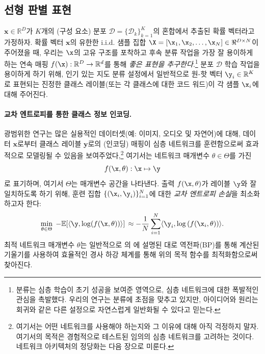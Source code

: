\documentclass[../../book-main_ko.tex]{subfiles}
\begin{document}
\subsection{선형 판별 표현}\label{subsec:LDR}

$\bm{x} \in \mathbb{R}^D$가 $K$개의 (구성 요소) 분포 $\mathcal{D} = \{\mathcal{D}_k\}_{k=1}^K$의 혼합에서 추출된 확률 벡터라고 가정하자. 확률 벡터 $\bm x$의 유한한 i.i.d. 샘플 집합 $\X = [\x_1, \x_2, \ldots, \x_N] \in \Re^{D\times N}$이 주어졌을 때, 우리는 $\x$의 고유 구조를 포착하고 후속 분류 작업을 가장 잘 용이하게 하는 연속 매핑 $f(\x): \mathbb{R}^D \rightarrow \mathbb{R}^d$를 통해 {\em 좋은 표현을 추구한다}.\footnote{분류는 심층 학습이 초기 성공을 보여준 영역으로, 심층 네트워크에 대한 폭발적인 관심을 촉발했다. 우리의 연구는 분류에 초점을 맞추고 있지만, 아이디어와 원리는 회귀와 같은 다른 설정으로 자연스럽게 일반화될 수 있다고 믿는다.} 분포 $\mathcal{D}$ 학습 작업을 용이하게 하기 위해, 인기 있는 지도 분류 설정에서 일반적으로 원-핫 벡터 $\y_i \in \mathbb{R}^K$로 표현되는 진정한 클래스 레이블(또는 각 클래스에 대한 코드 워드)이 각 샘플 $\x_i$에 대해 주어진다.

\paragraph{교차 엔트로피를 통한 클래스 정보 인코딩.}  광범위한 연구는 많은 실용적인 데이터셋(예: 이미지, 오디오 및 자연어)에 대해, 데이터 $\bm{x}$로부터 클래스 레이블 $\bm{y}$로의 (인코딩) 매핑이 심층 네트워크를 훈련함으로써 효과적으로 모델링될 수 있음을 보여주었다,\footnote{여기서는 어떤 네트워크를 사용해야 하는지와 그 이유에 대해 아직 걱정하지 말자. 여기서의 목적은 경험적으로 테스트된 임의의 심층 네트워크를 고려하는 것이다. 네트워크 아키텍처의 정당화는 다음 장으로 미룬다.} 여기서는 네트워크 매개변수 $\theta \in \Theta$를 가진 $$f(\x, \theta):\x \mapsto \y$$로 표기하며, 여기서 $\Theta$는 매개변수 공간을 나타낸다. 출력 $f(\x, \theta)$가 레이블 $\y$와 잘 일치하도록 하기 위해, 훈련 집합 $\{(\x_i, \y_i)\}_{i=1}^N$에 대한 {\em 교차 엔트로피 손실}을 최소화하고자 한다:
\begin{equation}
   \min_{\theta \in \Theta} \; - \mathbb{E}[\langle \y, \log(f(\x, \theta)) \rangle] \, \approx - \frac{1}{N}\sum_{i=1}^N \langle \y_i, \log\left(f(\x_i, \theta)\right) \rangle.
   \label{chap4-eqn:cross-entropy}
\end{equation}
최적 네트워크 매개변수 $\theta$는 일반적으로 의 에 설명된 대로 역전파(BP)를 통해 계산된 기울기를 사용하여 효율적인 경사 하강 체계를 통해 위의 목적 함수를 최적화함으로써 찾아진다.
\end{document}
